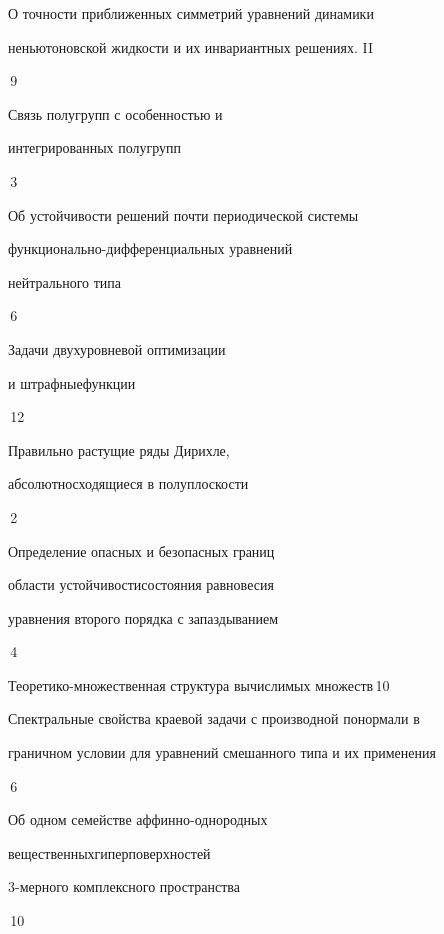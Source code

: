 

{О точности приближенных симметрий уравнений динамики \newline


неньютоновской жидкости и их инвариантных решениях. II}{\No\,9}




{Связь полугрупп с особенностью и


интегрированных полугрупп}{\No\,3}




{Об устойчивости решений почти периодической системы


функционально-\newline дифференциальных уравнений


нейтрального типа}{\No\,6}




{Задачи двухуровневой оптимизации


и штрафные\newline функции}{\No\,12}




{Правильно растущие ряды Дирихле,


абсолютно\newline сходящиеся в полуплоскости}{\No\,2}




{Определение опасных и безопасных границ  


области устойчивости\newline состояния равновесия  


уравнения второго порядка с запаздыванием}{\No\,4}




{Теоретико-множественная структура вычислимых множеств}{\No\,10}




{Спектральные свойства краевой задачи с производной по\newline нормали в 


граничном условии для уравнений смешанного типа и их применения}{\No\,6}




{Об одном семействе аффинно-однородных


вещественных\newline гиперповерхностей


3-мерного комплексного пространства}{\No\,10}


